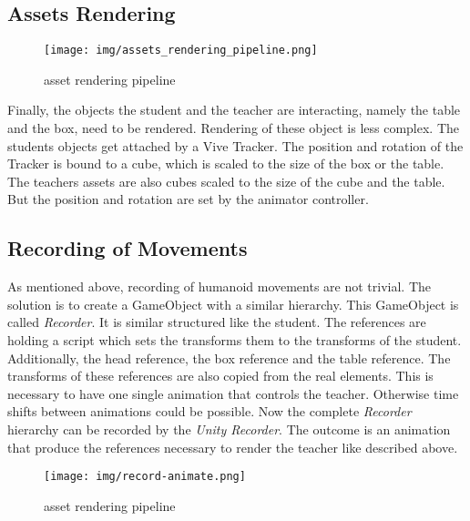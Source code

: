 \subsection{Assets Rendering}
\begin{figure}
	\centering
	\texttt{[image: img/assets\_rendering\_pipeline.png]}
	\caption{asset rendering pipeline}
	\label{fig:asset_rendering_pipeline}
\end{figure}
Finally, the objects the student and the teacher are interacting, namely the table and the box, need to be rendered. Rendering of these object is less complex. The students objects get attached by a Vive Tracker. The position and rotation of the Tracker is bound to a cube, which is scaled to the size of the box or the table. The teachers assets are also cubes scaled to the size of the cube and the table. But the position and rotation are set by the animator controller.
\subsection{Recording of Movements}
As mentioned above, recording of humanoid movements are not trivial. The solution is to create a GameObject with a similar hierarchy. This GameObject is called \textit{Recorder}. It is similar structured like the student. The references are holding a script which sets the transforms them to the transforms of the student. Additionally, the head reference, the box reference and the table reference. The transforms of these references are also copied from the real elements. This is necessary to have one single animation that controls the teacher. Otherwise time shifts between animations could be possible. Now the complete \textit{Recorder} hierarchy can be recorded by the \textit{Unity Recorder}. The outcome is an animation that produce the references necessary to render the teacher like described above.
\begin{figure}
	\centering
	\texttt{[image: img/record-animate.png]}
	\caption{asset rendering pipeline}
	\label{fig:record_animation}
\end{figure}
